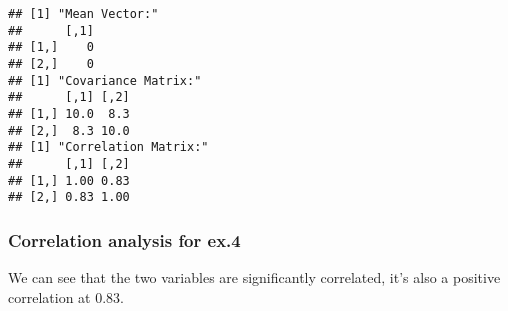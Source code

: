 \documentclass[]{article}
\begin{document}
\begin{verbatim}
## [1] "Mean Vector:"
##      [,1]
## [1,]    0
## [2,]    0
## [1] "Covariance Matrix:"
##      [,1] [,2]
## [1,] 10.0  8.3
## [2,]  8.3 10.0
## [1] "Correlation Matrix:"
##      [,1] [,2]
## [1,] 1.00 0.83
## [2,] 0.83 1.00
\end{verbatim}

\hypertarget{correlation-analysis-for-ex.4}{%
\subsubsection{Correlation analysis for
ex.4}\label{correlation-analysis-for-ex.4}}

We can see that the two variables are significantly correlated, it's
also a positive correlation at 0.83.
\end{document}
